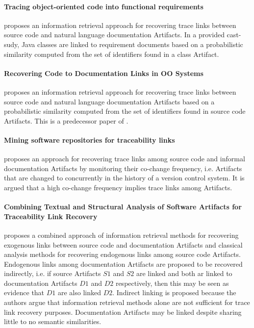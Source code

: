 \paragraph*{Tracing object-oriented code into functional requirements} 
\cite{AntoniolCCDM00}
proposes an information retrieval approach for recovering trace links between source code and natural language documentation \glspl{Artifact}.
In a provided cast-sudy, \gls{Java} classes are linked to requirement documents based on a probabilistic similarity computed from the set of identifiers found in a class \gls{Artifact}.

\paragraph*{Recovering Code to Documentation Links in OO Systems}
\cite{AntoniolCDLM99}
proposes an information retrieval approach for recovering trace links between source code and natural language documentation \glspl{Artifact} based on a  probabilistic similarity computed from the set of identifiers found in source code \glspl{Artifact}.
This is a predecessor paper of \cite{AntoniolCCDM00}.

\paragraph*{Mining software repositories for traceability links}
\cite{KagdiMS07}
proposes an approach for recovering trace links among source code and informal documentation \glspl{Artifact} by monitoring their co-change frequency, i.e. \glspl{Artifact} that are changed to concurrently in the history of a version control system.
It is argued that a high co-change frequency implies trace links among \glspl{Artifact}.

\paragraph*{Combining Textual and Structural Analysis of Software Artifacts for  Traceability Link Recovery}
\cite{McMillanPR2009}
proposes a combined approach of information retrieval methods for recovering exogenous links between source code and documentation \glspl{Artifact} and classical analysis methods for recovering endogenous links among source code \glspl{Artifact}.
Endogenous links among documentation \glspl{Artifact} are proposed to be recovered indirectly, i.e. if source \glspl{Artifact} $S1$ and $S2$ are linked and both ar linked to documentation \glspl{Artifact} $D1$ and $D2$ respectively, then this may be seen as evidence that $D1$ are also linked $D2$.
Indirect linking is proposed because the authors argue that information retrieval methods alone are not sufficient for trace link recovery purposes.
Documentation \glspl{Artifact} may be linked despite sharing little to no semantic similarities.


